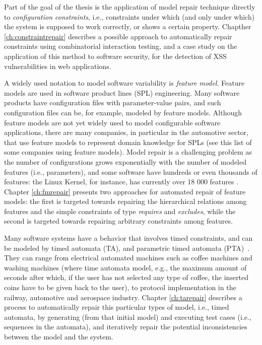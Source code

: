 Part of the goal of the thesis is the application of model repair technique directly to \textit{configuration constraints}, i.e., constraints under which (and only under which) the system is supposed to work correctly, or shows a certain property. 
Chapther \ref{ch:constraintrepair} describes a possible approach to automatically repair constraints using combinatorial interaction testing, and a case study on the application of this method to software security, for the detection of XSS vulnerabilities in web applications.

A widely used notation to model software variability is \textit{feature model}. Feature models are used in software product lines (SPL) engineering. Many software products have configuration files with parameter-value pairs, and such configuration files can be, for example, modeled by feature models. Although feature models are not yet widely used to model %
configurable software applications, there are many companies, in particular in the automotive sector, that use feature models to represent domain knowledge for SPLs (see this list \cite{deJong2001} of some companies using feature models).
Model repair is a challenging problem as the number of configurations grows exponentially with the number of modeled features (i.e., parameters), and some software have hundreds or even thousands of features: the Linux Kernel, for instance, has currently over 18 000 features \cite{thum_towards_2019}.
Chapter \ref{ch:fmrepair} presents two approaches for automated repair of feature models: the first is targeted {towards repairing} the hierarchical relations among features and the simple constraints of type \textit{requires} and \textit{excludes}, while the second is targeted towards repairing arbitrary constraints among features.

Many software systems have a behavior that involves timed constraints, and can be modeled by timed automata (TA), and parametric timed automata (PTA)~\cite{ACEF09,AD94,AFKS12}. They can range from electrical automated machines such as coffee machines and washing machines (where time automata model, e.g., the maximum amount of seconds after which, if the user has not selected any type of coffee, the inserted coins have to be given back to the user), to protocol implementation in the railway, automotive and aerospace industry.
Chapter \ref{ch:tarepair} describes a process to automatically repair this particular types of model, i.e., timed automata, by generating (from that initial model) and executing test cases (i.e., sequences in the automata), and iteratively repair the potential inconsistencies between the model and the system.

